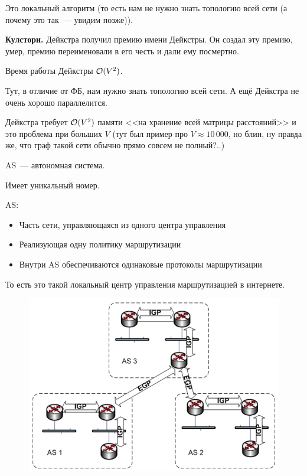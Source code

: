 Это локальный алгоритм (то есть нам не нужно знать топологию всей сети (а почему это так~--- увидим позже)).

{\bf Кулстори.} Дейкстра получил премию имени Дейкстры. Он создал эту премию, умер, премию переименовали в его честь и дали ему посмертно.

Время работы Дейкстры $\mathcal{O}(V^2)$.

Тут, в отличие от ФБ, нам нужно знать топологию всей сети. А ещё Дейкстра не очень хорошо параллелится.

Дейкстра требует $\mathcal{O}(V^2)$ памяти <<на хранение всей матрицы расстояний>> и это проблема при больших $V$ (тут был пример про $V\approx 10\,000$, но блин, ну правда же, что граф такой сети обычно прямо совсем не полный?..) 


AS~--- автономная система.

Имеет уникальный номер.

AS:
\begin{itemize}
    \item Часть сети, управляющаяся из одного центра управления
    \item Реализующая одну политику маршрутизации
    \item Внутри AS обеспечиваются одинаковые протоколы маршрутизации
\end{itemize}

То есть это такой локальный центр управления маршрутизацией в интернете.

\begin{figure}[H]
  \centering
  \includegraphics[width=15cm]{images/04/04}
\end{figure}

